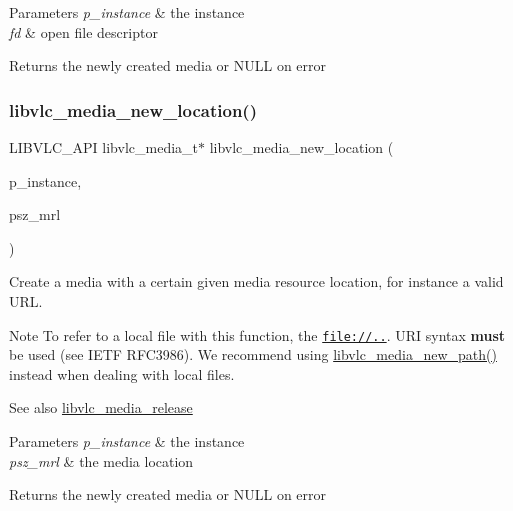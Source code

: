 \begin{DoxyParams}{Parameters}
{\em p\+\_\+instance} & the instance \\
\hline
{\em fd} & open file descriptor \\
\hline
\end{DoxyParams}
\begin{DoxyReturn}{Returns}
the newly created media or N\+U\+LL on error 
\end{DoxyReturn}
\mbox{\label{group__libvlc__media_gae1d3baee3f4610c6fe5818defcad3e6f}} 
\subsubsection{\texorpdfstring{libvlc\+\_\+media\+\_\+new\+\_\+location()}{libvlc\_media\_new\_location()}}
{\footnotesize\ttfamily L\+I\+B\+V\+L\+C\+\_\+\+A\+PI libvlc\+\_\+media\+\_\+t$\ast$ libvlc\+\_\+media\+\_\+new\+\_\+location (\begin{DoxyParamCaption}\item[{\hyperlink{group__libvlc__core_ga316d739a80da4678206c79f4d6c2e284}{libvlc\+\_\+instance\+\_\+t} $\ast$}]{p\+\_\+instance,  }\item[{const char $\ast$}]{psz\+\_\+mrl }\end{DoxyParamCaption})}

Create a media with a certain given media resource location, for instance a valid U\+RL.

\begin{DoxyNote}{Note}
To refer to a local file with this function, the \href{file://..}{\tt file\+://..}. U\+RI syntax {\bfseries must} be used (see I\+E\+TF R\+F\+C3986). We recommend using \hyperlink{group__libvlc__media_ga051342375370f3bf3821a537d4413435}{libvlc\+\_\+media\+\_\+new\+\_\+path()} instead when dealing with local files.
\end{DoxyNote}
\begin{DoxySeeAlso}{See also}
\hyperlink{group__libvlc__media_gaffccede262624a361e20c3e887fa9b42}{libvlc\+\_\+media\+\_\+release}
\end{DoxySeeAlso}

\begin{DoxyParams}{Parameters}
{\em p\+\_\+instance} & the instance \\
\hline
{\em psz\+\_\+mrl} & the media location \\
\hline
\end{DoxyParams}
\begin{DoxyReturn}{Returns}
the newly created media or N\+U\+LL on error 
\end{DoxyReturn}
\mbox{\label{group__libvlc__media_ga051342375370f3bf3821a537d4413435}} 
